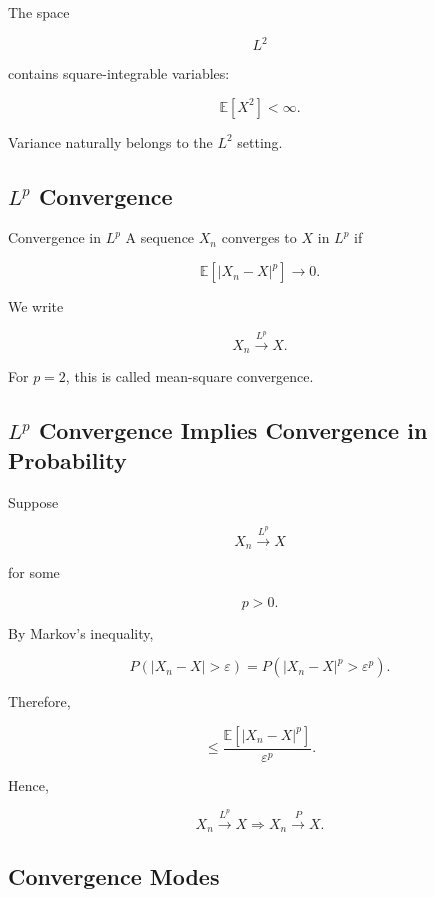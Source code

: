 The space

\[
L^2
\]

contains square-integrable variables:

\[
\boxed{
\mathbb{E}[X^2]<\infty.
}
\]

Variance naturally belongs to the \(L^2\) setting.

\subsection{\(L^p\) Convergence}
\label{subsec:lp-convergence-probability}

\begin{definitionbox}{Convergence in \(L^p\)}
A sequence \(X_n\) converges to \(X\) in \(L^p\) if

\[
\boxed{
\mathbb{E}
[
|X_n-X|^p
]
\to0.
}
\]
\end{definitionbox}

We write

\[
\boxed{
X_n
\xrightarrow{L^p}
X.
}
\]

For \(p=2\), this is called mean-square convergence.

\subsection{\(L^p\) Convergence Implies Convergence in Probability}
\label{subsec:lp-implies-probability}

Suppose

\[
X_n
\xrightarrow{L^p}
X
\]

for some

\[
p>0.
\]

By Markov's inequality,

\[
P(|X_n-X|>\varepsilon)
=
P(|X_n-X|^p>\varepsilon^p).
\]

Therefore,

\[
\leq
\frac{
\mathbb{E}[|X_n-X|^p]
}{
\varepsilon^p
}.
\]

Hence,

\[
\boxed{
X_n
\xrightarrow{L^p}
X
\Longrightarrow
X_n
\xrightarrow{P}
X.
}
\]

\subsection{Convergence Modes}
\label{subsec:convergence-modes-measure}

